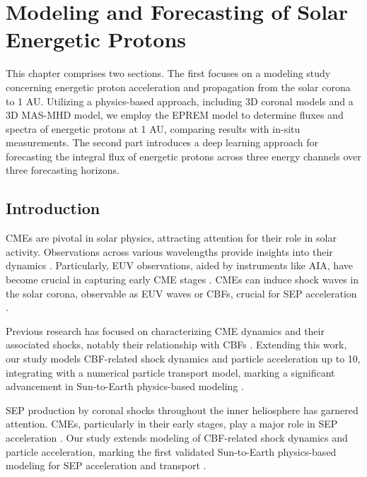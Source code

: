 \chapter{Modeling and Forecasting of Solar Energetic Protons}
\label{chapter4}
This chapter comprises two sections. The first focuses on a modeling study concerning energetic proton acceleration and propagation from the solar corona to 1 AU. Utilizing a physics-based approach, including 3D coronal models and a 3D MAS-MHD model, we employ the EPREM model to determine fluxes and spectra of energetic protons at 1 AU, comparing results with in-situ measurements. The second part introduces a deep learning approach for forecasting the integral flux of energetic protons across three energy channels over three forecasting horizons.

\section{Introduction}
\label{sec_ch4_intro}
CMEs are pivotal in solar physics, attracting attention for their role in solar activity. Observations across various wavelengths provide insights into their dynamics \citep{vourlidas_2003, zhang_2006, bein_2011, bastian_2001, veronig_2010}. Particularly, EUV observations, aided by instruments like AIA, have become crucial in capturing early CME stages \citep{lemen_2012, pesnell_2012}. CMEs can induce shock waves in the solar corona, observable as EUV waves or CBFs, crucial for SEP acceleration \citep{thompson_1998, long_2011, ontiveross_2009, gopalswamy_2011, battarbee_2013, kozarev_2013, schwadron_2014, kong_2017}.

Previous research has focused on characterizing CME dynamics and their associated shocks, notably their relationship with CBFs \citep{kozarev_2019}. Extending this work, our study models CBF-related shock dynamics and particle acceleration up to 10\rsun, integrating with a numerical particle transport model, marking a significant advancement in Sun-to-Earth physics-based modeling \citep{kozarev_2022}.

SEP production by coronal shocks throughout the inner heliosphere has garnered attention. CMEs, particularly in their early stages, play a major role in SEP acceleration \citep{reames_1999, ontiveross_2009, gopalswamy_2011, battarbee_2013, kozarev_2013, schwadron_2014, kong_2017}. Our study extends modeling of CBF-related shock dynamics and particle acceleration, marking the first validated Sun-to-Earth physics-based modeling for SEP acceleration and transport \citep{kozarev_2022}.

